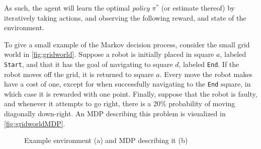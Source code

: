 As such, the agent will learn the optimal \textit{policy} $\pi^*$ (or estimate thereof) by iteratively taking actions, and observing the following reward, and state of the environment.

To give a small example of the Markov decision process, consider the small grid world in \cref{fig:gridworld}. 
Suppose a robot is initially placed in square $a$, labeled \texttt{Start}, and that it has the goal of navigating to square $d$, labeled \texttt{End}. 
If the robot moves off the grid, it is returned to square $a$. 
Every move the robot makes have a cost of one, except for when successfully navigating to the \texttt{End} square, in which case it is rewarded with one point. 
Finally, suppose that the robot is faulty, and whenever it attempts to go right, there is a 20\% probability of moving diagonally down-right.
An MDP describing this problem is visualized in \cref{fig:gridworldMDP}.

\begin{figure}[!htb]
    \centering
    \begin{minipage}[t]{0.34\textwidth}
        \centering
        \label{fig:gridworld}
    \end{minipage}
    \begin{minipage}[t]{0.6\textwidth}
        \centering
        \label{fig:gridworldMDP}
    \end{minipage}
    \caption{Example environment (a) and MDP describing it (b)}
    \label{fig:MDP}
\end{figure}



